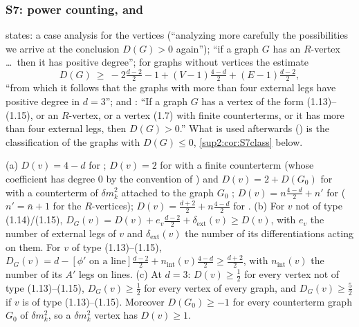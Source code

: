 
\subsubsection{S7: power counting, \cite[(2.17)]{Ba3} and \cite[Cor.~2.3]{Ba3}}\label{sup2:ssec:S7}

\cite[pp.~428--429]{Ba3} states: a case analysis for the vertices \cite[(1.13)--(1.15)]{Ba3} (``analyzing more carefully the possibilities we arrive at the conclusion $D(G)>0$ again''); ``if a graph $G$ has an $R$-vertex \dots\ then it has positive degree''; for graphs without \cite[(1.13)--(1.15)]{Ba3} vertices the estimate
\begin{equation}\label{sup2:eq:217}
D(G)\ \ge\ -2\tfrac{d-2}2-1+(V-1)\tfrac{4-d}2+(E-1)\tfrac{d-2}2,\tag{2.17}
\end{equation}
``from which it follows that the graphs with more than four external legs have positive degree in $d=3$''; and \cite[Cor.~2.3]{Ba3}: ``If a graph $G$ has a vertex of the form (1.13)--(1.15), or an $R$-vertex, or a vertex (1.7) with finite counterterms, or it has more than four external legs, then $D(G)>0$.'' What is used afterwards (\cite[pp.~429--432]{Ba3}) is the classification of the graphs with $D(G)\le0$, \cref{sup2:cor:S7class} below.

\begin{lemma}\label{sup2:lem:S7vert}
\textup{(a)} $D(v)=4-d$ for \cite[(1.6)]{Ba3}; $D(v)=2$ for \cite[(1.7)]{Ba3} with a finite counterterm (whose coefficient has degree $0$ by the convention of \cite[p.~423]{Ba3}) and $D(v)=2+D(G_0)$ for \cite[(1.7)]{Ba3} with a counterterm of $\delta m^2_k$ attached to the graph $G_0$ \cite[(2.3)]{Ba3}; $D(v)=n\frac{4-d}2+n'$ for \cite[(1.8)--(1.11)]{Ba3} ($n'=\bar n+1$ for the $R$-vertices); $D(v)=\frac{d+2}2+n\frac{4-d}2$ for \cite[(1.13)--(1.15)]{Ba3}.
\textup{(b)} For $v$ not of type (1.14)/(1.15), $D_G(v)=D(v)+e_v\frac{d-2}2+\delta_{\mathrm{ext}}(v)\ge D(v)$, with $e_v$ the number of external legs of $v$ and $\delta_{\mathrm{ext}}(v)$ the number of its differentiations acting on them. For $v$ of type (1.13)--(1.15), $D_G(v)=d-[\phi'\text{ on a line}]\frac{d-2}2+n_{\mathrm{int}}(v)\frac{4-d}2\ge\frac{d+2}2$, with $n_{\mathrm{int}}(v)$ the number of its $A'$ legs on lines.
\textup{(c)} At $d=3$: $D(v)\ge\frac12$ for every vertex not of type (1.13)--(1.15), $D_G(v)\ge\frac12$ for every vertex of every graph, and $D_G(v)\ge\frac52$ if $v$ is of type (1.13)--(1.15). Moreover $D(G_0)\ge-1$ for every counterterm graph $G_0$ of $\delta m^2_k$, so a $\delta m^2_k$ vertex has $D(v)\ge1$.
\end{lemma}

